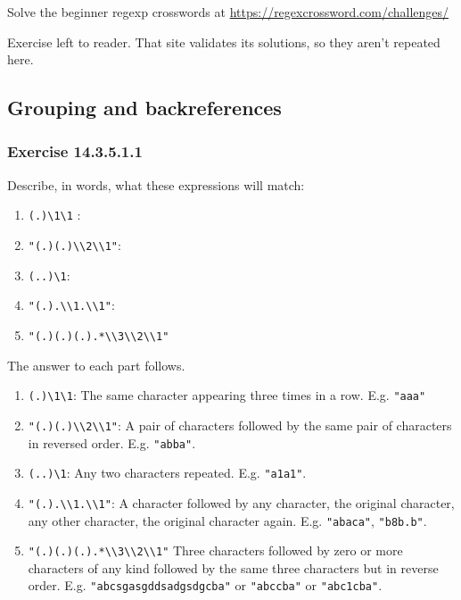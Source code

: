 \documentclass[]{book}
\providecommand{\tightlist}{%
  \setlength{\itemsep}{0pt}\setlength{\parskip}{0pt}}
\theoremstyle{plain}
\theoremstyle{remark}
\begin{document}
Solve the beginner regexp crosswords at \url{https://regexcrossword.com/challenges/}

Exercise left to reader. That site validates its solutions, so they aren't repeated here.

\hypertarget{grouping-and-backreferences}{%
\subsection{Grouping and backreferences}\label{grouping-and-backreferences}}

\hypertarget{exercise-14.3.5.1.1}{%
\subsubsection*{\texorpdfstring{Exercise {14.3.5.1.1}}{Exercise 14.3.5.1.1}}\label{exercise-14.3.5.1.1}}

Describe, in words, what these expressions will match:

\begin{enumerate}
\def\labelenumi{\arabic{enumi}.}
\tightlist
\item
  \texttt{(.)\textbackslash{}1\textbackslash{}1} :
\item
  \texttt{"(.)(.)\textbackslash{}\textbackslash{}2\textbackslash{}\textbackslash{}1"}:
\item
  \texttt{(..)\textbackslash{}1}:
\item
  \texttt{"(.).\textbackslash{}\textbackslash{}1.\textbackslash{}\textbackslash{}1"}:
\item
  \texttt{"(.)(.)(.).*\textbackslash{}\textbackslash{}3\textbackslash{}\textbackslash{}2\textbackslash{}\textbackslash{}1"}
\end{enumerate}

The answer to each part follows.

\begin{enumerate}
\def\labelenumi{\arabic{enumi}.}
\tightlist
\item
  \texttt{(.)\textbackslash{}1\textbackslash{}1}: The same character appearing three times in a row. E.g. \texttt{"aaa"}
\item
  \texttt{"(.)(.)\textbackslash{}\textbackslash{}2\textbackslash{}\textbackslash{}1"}: A pair of characters followed by the same pair of characters in reversed order. E.g. \texttt{"abba"}.
\item
  \texttt{(..)\textbackslash{}1}: Any two characters repeated. E.g. \texttt{"a1a1"}.
\item
  \texttt{"(.).\textbackslash{}\textbackslash{}1.\textbackslash{}\textbackslash{}1"}: A character followed by any character, the original character, any other character, the original character again. E.g. \texttt{"abaca"}, \texttt{"b8b.b"}.
\item
  \texttt{"(.)(.)(.).*\textbackslash{}\textbackslash{}3\textbackslash{}\textbackslash{}2\textbackslash{}\textbackslash{}1"} Three characters followed by zero or more characters of any kind followed by the same three characters but in reverse order. E.g. \texttt{"abcsgasgddsadgsdgcba"} or \texttt{"abccba"} or \texttt{"abc1cba"}.
\end{enumerate}
\end{document}
